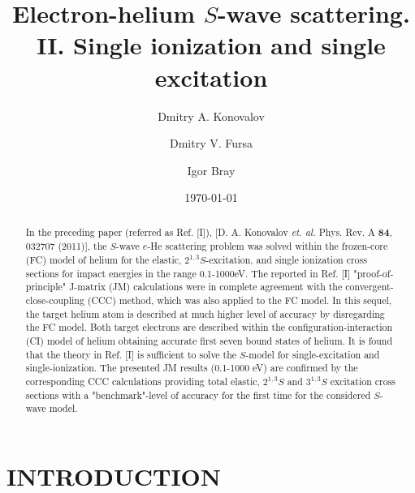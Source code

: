 \documentclass[aip
, pra
, showpacs
, aps
, twocolumn
, groupedaddress
, floatfix
]{revtex4}
\begin{document}
\title {Electron-helium $S$-wave scattering. II. Single ionization and single excitation}

\author{Dmitry A. Konovalov}

\author{Dmitry V. Fursa}

\author{Igor Bray}



\date{\today}

\begin{abstract}

In the preceding paper (referred as Ref. [I]), [D. A. Konovalov {\em et. al.} Phys. Rev. A {\bf 84}, 032707 (2011)],
the $S$-wave $e$-He scattering problem was solved within the frozen-core (FC) model of helium for
the elastic, $2^{1,3}S$-excitation, and single ionization cross sections for impact energies in the range 0.1-1000eV.
The reported in Ref. [I] "proof-of-principle" J-matrix (JM) calculations were in complete agreement with the convergent-close-coupling (CCC) method,
which was also applied to the FC model.
In this sequel, the target helium atom is described at much higher level of accuracy by disregarding the FC model.
Both target electrons are described within the configuration-interaction (CI) model of helium obtaining accurate
first seven bound states of helium.
It is found that the theory in Ref. [I] is sufficient to solve the $S$-model for single-excitation and single-ionization.
The presented JM results (0.1-1000 eV) are confirmed by the corresponding CCC calculations providing
total elastic, $2^{1,3}S$ and $3^{1,3}S$ excitation cross sections with a "benchmark"-level of accuracy for the first time for the considered $S$-wave model.

\end{abstract}

\maketitle



\section{INTRODUCTION}
\end{document}
